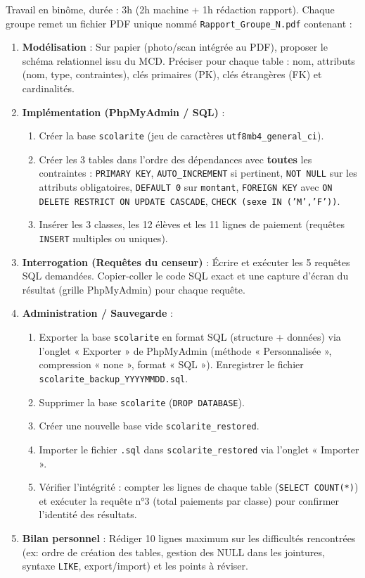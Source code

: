 \documentclass[11pt]{article}
\newcounter{popsec}
\newcounter{popsub}
\newcommand{\courssub}[1]{%
  \stepcounter{popsub}%
  \par\vspace{9pt}\noindent{\popxbold\fontsize{11.5}{13}\selectfont\color{popink}{\color{poporange}\thepopsec.\thepopsub}\hspace{6pt}#1}\par\nopagebreak\vspace{4pt}
}
\begin{document}
\courssub{Consignes}
Travail en binôme, durée : 3h (2h machine + 1h rédaction rapport). Chaque groupe remet un fichier PDF unique nommé \texttt{Rapport\_Groupe\_N.pdf} contenant :

\begin{enumerate}
    \item \textbf{Modélisation} : Sur papier (photo/scan intégrée au PDF), proposer le schéma relationnel issu du MCD. Préciser pour chaque table : nom, attributs (nom, type, contraintes), clés primaires (PK), clés étrangères (FK) et cardinalités.
    \item \textbf{Implémentation (PhpMyAdmin / SQL)} :
        \begin{enumerate}
            \item Créer la base \texttt{scolarite} (jeu de caractères \texttt{utf8mb4\_general\_ci}).
            \item Créer les 3 tables dans l'ordre des dépendances avec \textbf{toutes} les contraintes : \texttt{PRIMARY KEY}, \texttt{AUTO\_INCREMENT} si pertinent, \texttt{NOT NULL} sur les attributs obligatoires, \texttt{DEFAULT 0} sur \texttt{montant}, \texttt{FOREIGN KEY} avec \texttt{ON DELETE RESTRICT ON UPDATE CASCADE}, \texttt{CHECK (sexe IN ('M','F'))}.
            \item Insérer les 3 classes, les 12 élèves et les 11 lignes de paiement (requêtes \texttt{INSERT} multiples ou uniques).
        \end{enumerate}
    \item \textbf{Interrogation (Requêtes du censeur)} : Écrire et exécuter les 5 requêtes SQL demandées. Copier-coller le code SQL exact et une capture d'écran du résultat (grille PhpMyAdmin) pour chaque requête.
    \item \textbf{Administration / Sauvegarde} :
        \begin{enumerate}
            \item Exporter la base \texttt{scolarite} en format SQL (structure + données) via l'onglet « Exporter » de PhpMyAdmin (méthode « Personnalisée », compression « none », format « SQL »). Enregistrer le fichier \texttt{scolarite\_backup\_YYYYMMDD.sql}.
            \item Supprimer la base \texttt{scolarite} (\texttt{DROP DATABASE}).
            \item Créer une nouvelle base vide \texttt{scolarite\_restored}.
            \item Importer le fichier \texttt{.sql} dans \texttt{scolarite\_restored} via l'onglet « Importer ».
            \item Vérifier l'intégrité : compter les lignes de chaque table (\texttt{SELECT COUNT(*)}) et exécuter la requête n°3 (total paiements par classe) pour confirmer l'identité des résultats.
        \end{enumerate}
    \item \textbf{Bilan personnel} : Rédiger 10 lignes maximum sur les difficultés rencontrées (ex: ordre de création des tables, gestion des NULL dans les jointures, syntaxe \texttt{LIKE}, export/import) et les points à réviser.
\end{enumerate}
\end{document}
